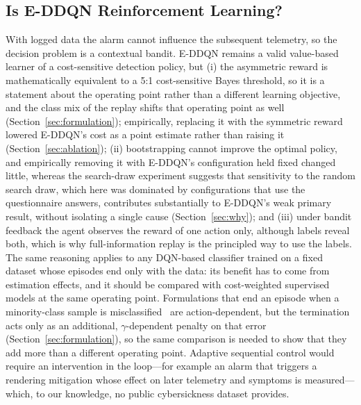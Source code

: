 \subsection{Is E-DDQN Reinforcement Learning?}
With logged data the alarm cannot influence the subsequent telemetry, so the decision problem is a contextual bandit. E-DDQN remains a valid value-based learner of a cost-sensitive detection policy, but (i) the asymmetric reward is mathematically equivalent to a 5:1 cost-sensitive Bayes threshold, so it is a statement about the operating point rather than a different learning objective, and the class mix of the replay shifts that operating point as well (Section~\ref{sec:formulation}); empirically, replacing it with the symmetric reward lowered E-DDQN's cost as a point estimate rather than raising it (Section~\ref{sec:ablation}); (ii) bootstrapping cannot improve the optimal policy, and empirically removing it with E-DDQN's configuration held fixed changed little, whereas the search-draw experiment suggests that sensitivity to the random search draw, which here was dominated by configurations that use the questionnaire answers, contributes substantially to E-DDQN's weak primary result, without isolating a single cause (Section~\ref{sec:why}); and (iii) under bandit feedback the agent observes the reward of one action only, although labels reveal both, which is why full-information replay is the principled way to use the labels. The same reasoning applies to any DQN-based classifier trained on a fixed dataset whose episodes end only with the data: its benefit has to come from estimation effects, and it should be compared with cost-weighted supervised models at the same operating point. Formulations that end an episode when a minority-class sample is misclassified~\cite{lin2020imbalanced,yang2024drlimbalanced} are action-dependent, but the termination acts only as an additional, $\gamma$-dependent penalty on that error (Section~\ref{sec:formulation}), so the same comparison is needed to show that they add more than a different operating point. Adaptive sequential control would require an intervention in the loop---for example an alarm that triggers a rendering mitigation whose effect on later telemetry and symptoms is measured---which, to our knowledge, no public cybersickness dataset provides.

